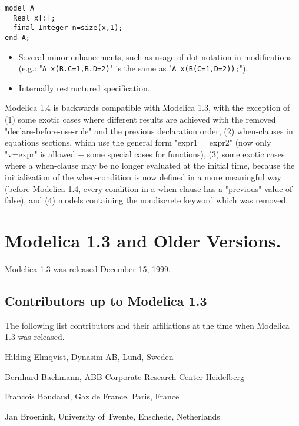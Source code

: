 \begin{lstlisting}[language=modelica]
model A
  Real x[:];
  final Integer n=size(x,1);
end A;
\end{lstlisting}

\begin{itemize}
\item
  Several minor enhancements, such as usage of dot-notation in
  modifications\\
  (e.g.: "\lstinline!A x(B.C=1,B.D=2)!" is the same as "\lstinline!A x(B(C=1,D=2));!").
\item
  Internally restructured specification.
\end{itemize}

Modelica 1.4 is backwards compatible with Modelica 1.3, with the
exception of (1) some exotic cases where different results are achieved
with the removed "declare-before-use-rule" and the previous declaration
order, (2) when-clauses in equations sections, which use the general
form "expr1 = expr2" (now only "v=expr" is allowed + some special cases
for functions), (3) some exotic cases where a when-clause may be no
longer evaluated at the initial time, because the initialization of the
when-condition is now defined in a more meaningful way (before Modelica
1.4, every condition in a when-clause has a "previous" value of false),
and (4) models containing the nondiscrete keyword which was removed.

\section{Modelica 1.3 and Older Versions.}

Modelica 1.3 was released December 15, 1999.

\subsection{Contributors up to Modelica 1.3}
The following list contributors and their affiliations at the time when
Modelica 1.3 was released.

Hilding Elmqvist, Dynasim AB, Lund, Sweden

Bernhard Bachmann, ABB Corporate Research Center Heidelberg

Francois Boudaud, Gaz de France, Paris, France

Jan Broenink, University of Twente, Enschede, Netherlands

